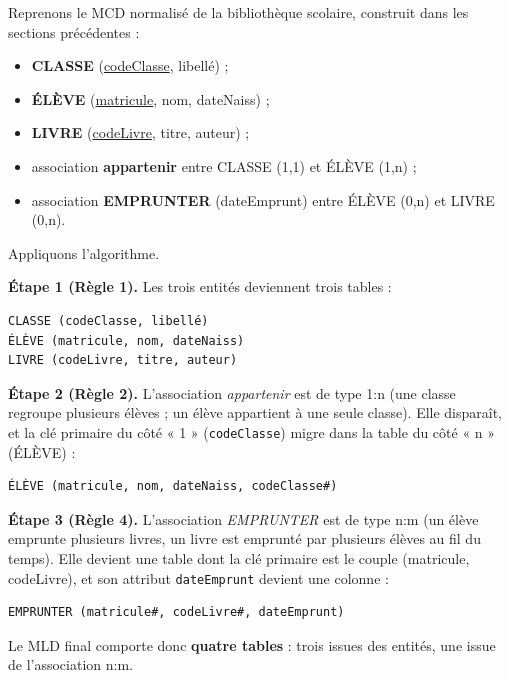 \documentclass[11pt]{article}
\begin{document}
Reprenons le MCD normalisé de la bibliothèque scolaire, construit dans les sections précédentes :
\begin{itemize}
\item \textbf{CLASSE} (\underline{codeClasse}, libellé) ;
\item \textbf{ÉLÈVE} (\underline{matricule}, nom, dateNaiss) ;
\item \textbf{LIVRE} (\underline{codeLivre}, titre, auteur) ;
\item association \textbf{appartenir} entre CLASSE (1,1) et ÉLÈVE (1,n) ;
\item association \textbf{EMPRUNTER} (dateEmprunt) entre ÉLÈVE (0,n) et LIVRE (0,n).
\end{itemize}

Appliquons l'algorithme.

\textbf{Étape 1 (Règle 1).} Les trois entités deviennent trois tables :
\begin{center}
\begin{lstlisting}
CLASSE (codeClasse, libellé)
ÉLÈVE (matricule, nom, dateNaiss)
LIVRE (codeLivre, titre, auteur)
\end{lstlisting}
\end{center}

\textbf{Étape 2 (Règle 2).} L'association \emph{appartenir} est de type 1:n (une classe regroupe plusieurs élèves ; un élève appartient à une seule classe). Elle disparaît, et la clé primaire du côté « 1 » (\texttt{codeClasse}) migre dans la table du côté « n » (ÉLÈVE) :
\begin{center}
\begin{lstlisting}
ÉLÈVE (matricule, nom, dateNaiss, codeClasse#)
\end{lstlisting}
\end{center}

\textbf{Étape 3 (Règle 4).} L'association \emph{EMPRUNTER} est de type n:m (un élève emprunte plusieurs livres, un livre est emprunté par plusieurs élèves au fil du temps). Elle devient une table dont la clé primaire est le couple (matricule, codeLivre), et son attribut \texttt{dateEmprunt} devient une colonne :
\begin{center}
\begin{lstlisting}
EMPRUNTER (matricule#, codeLivre#, dateEmprunt)
\end{lstlisting}
\end{center}

Le MLD final comporte donc \textbf{quatre tables} : trois issues des entités, une issue de l'association n:m.
\end{document}
